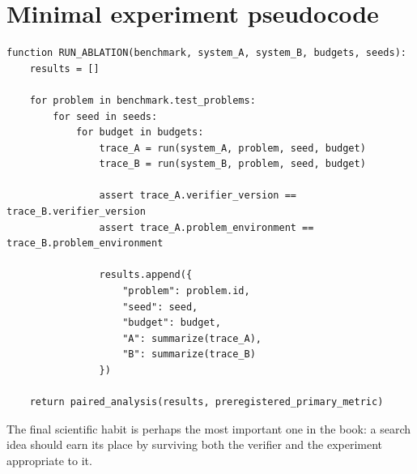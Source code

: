 \documentclass[11pt,openany]{book}
\theoremstyle{definition}
\theoremstyle{remark}
\begin{document}
\section{Minimal experiment pseudocode}
\begin{lstlisting}[style=pseudo,caption={Paired ablation harness for any Lab conjecture}]
function RUN_ABLATION(benchmark, system_A, system_B, budgets, seeds):
    results = []

    for problem in benchmark.test_problems:
        for seed in seeds:
            for budget in budgets:
                trace_A = run(system_A, problem, seed, budget)
                trace_B = run(system_B, problem, seed, budget)

                assert trace_A.verifier_version == trace_B.verifier_version
                assert trace_A.problem_environment == trace_B.problem_environment

                results.append({
                    "problem": problem.id,
                    "seed": seed,
                    "budget": budget,
                    "A": summarize(trace_A),
                    "B": summarize(trace_B)
                })

    return paired_analysis(results, preregistered_primary_metric)
\end{lstlisting}

The final scientific habit is perhaps the most important one in the book: a search idea should earn its place by surviving both the verifier and the experiment appropriate to it.
\end{document}
